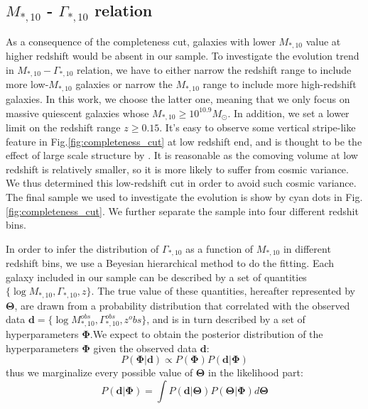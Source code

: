 \documentclass[fleqn,usenatbib]{mnras}
\begin{document}
\subsection{$M_{*,10}$ - $\Gamma_{*,10}$ relation}
As a consequence of the completeness cut, galaxies with lower $M_{*,10}$ value at higher redshift would be absent in our sample. To investigate the evolution trend in $M_{*,10 } - \Gamma_{*,10}$ relation, we have to either narrow the redshift range to include more low-$M_{*,10}$ galaxies or narrow the $M_{*,10}$ range to include more high-redshift galaxies. In this work, we choose the latter one, meaning that we only focus on massive quiescent galaxies whose $M_{*,10} \geq 10^{10.9} M_{\odot}$. In addition, we set a lower limit on the redshift range $ z \geq 0.15$. It's easy to observe some vertical stripe-like feature in Fig.\ref{fig:completeness_cut} at low redshift end, and is thought to be the effect of large scale structure by \cite{GAMAmain}. It is reasonable as the comoving volume at low redshift is relatively smaller, so it is more likely to suffer from cosmic variance. We thus determined this low-redshift cut in order to avoid such cosmic variance. The final sample we used to investigate the evolution is show by cyan dots in Fig.\ref{fig:completeness_cut}. We further separate the sample into four different redshit bins.  
\par In order to infer the distribution of $\Gamma_{*,10}$ as a function of $M_{*,10}$ in different redshift bins, we use a Beyesian hierarchical method to do the fitting. Each galaxy included in our sample can be described by a set of quantities $\{ \log M_{*,10}, \Gamma_{*,10}, z \}$. The true value of these quantities, hereafter represented by $\mathbf{\Theta}$, are drawn from a probability distribution that correlated with the observed data $\mathbf{d} = \{ \log M_{*,10}^{obs}, \Gamma_{*,10}^{obs}, z^obs \}$, and is in turn described by a set of hyperparameters $\mathbf{\Phi}$.We expect to obtain the posterior distribution of the hyperparameters $\mathbf{\Phi}$ given the observed data $\mathbf{d}$: 
\begin{equation}
    P(\mathbf{\Phi}|\mathbf{d}) \propto  P(\mathbf{\Phi}) P(\mathbf{d}|\mathbf{\Phi})
\end{equation}
thus we marginalize every possible value of $\mathbf{\Theta}$ in the likelihood part: 
\begin{equation}
    \label{Eq:likelihood}
    P(\mathbf{d}|\mathbf{\Phi}) = \int P(\mathbf{d}|\mathbf{\Theta})P(\mathbf{\Theta}|\mathbf{\Phi})d\mathbf{\Theta}
\end{equation}
\end{document}
